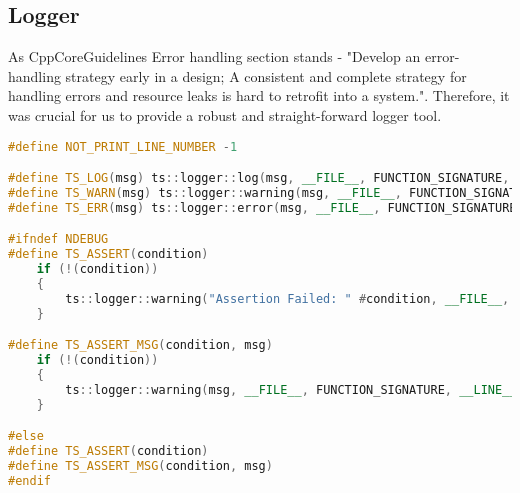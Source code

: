 \newpage

\subsection{Logger}
As CppCoreGuidelines \cite{CppCoreGuidelines} Error handling section stands - "Develop an error-handling strategy early in a design; A consistent and complete strategy for handling errors and resource leaks is hard to retrofit into a system.". Therefore, it was crucial for us to provide a robust and straight-forward logger tool.
\begin{lstlisting}[language=c++, caption=Logger macros (./engine/include/tsengine/logger.h)]
#define NOT_PRINT_LINE_NUMBER -1

#define TS_LOG(msg) ts::logger::log(msg, __FILE__, FUNCTION_SIGNATURE, __LINE__)
#define TS_WARN(msg) ts::logger::warning(msg, __FILE__, FUNCTION_SIGNATURE, __LINE__)
#define TS_ERR(msg) ts::logger::error(msg, __FILE__, FUNCTION_SIGNATURE, __LINE__)

#ifndef NDEBUG
#define TS_ASSERT(condition)                                                                                \
    if (!(condition))                                                                                       \
    {                                                                                                       \
        ts::logger::warning("Assertion Failed: " #condition, __FILE__, FUNCTION_SIGNATURE, __LINE__, true); \
    }

#define TS_ASSERT_MSG(condition, msg)                                           \
    if (!(condition))                                                           \
    {                                                                           \
        ts::logger::warning(msg, __FILE__, FUNCTION_SIGNATURE, __LINE__, true); \
    }

#else
#define TS_ASSERT(condition)
#define TS_ASSERT_MSG(condition, msg)
#endif
\end{lstlisting}

\newpage

